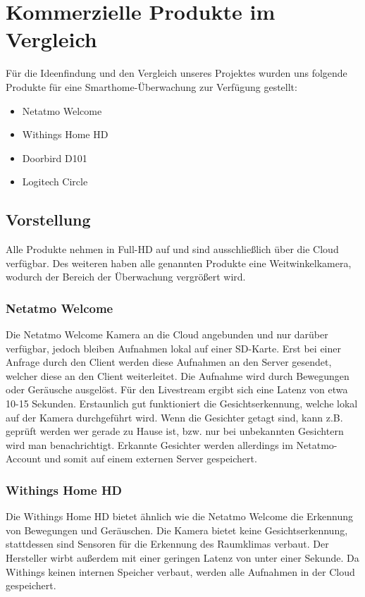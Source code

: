 \chapter{Kommerzielle Produkte im Vergleich}
Für die Ideenfindung und den Vergleich unseres Projektes wurden uns folgende Produkte für eine Smarthome-Überwachung zur Verfügung gestellt:

\begin{itemize}
	\item Netatmo Welcome
	\item Withings Home HD
	\item Doorbird D101
	\item Logitech Circle
\end{itemize}

\section{Vorstellung}

Alle Produkte nehmen in Full-HD  auf und sind ausschließlich über die Cloud verfügbar. Des weiteren haben alle genannten Produkte eine Weitwinkelkamera, wodurch der Bereich der Überwachung vergrößert wird.

\subsection{Netatmo Welcome}
Die Netatmo Welcome Kamera an die Cloud angebunden und nur darüber verfügbar, jedoch bleiben Aufnahmen lokal auf einer SD-Karte. Erst bei einer Anfrage durch den Client werden diese Aufnahmen an den Server gesendet, welcher diese an den Client weiterleitet. Die Aufnahme wird durch Bewegungen oder Geräusche ausgelöst. Für den Livestream ergibt sich eine Latenz von etwa 10-15 Sekunden. Erstaunlich gut funktioniert die Gesichtserkennung, welche lokal auf der Kamera durchgeführt wird. Wenn die Gesichter getagt sind, kann z.B. geprüft werden wer gerade zu Hause ist, bzw. nur bei unbekannten Gesichtern wird man benachrichtigt. Erkannte Gesichter werden allerdings im Netatmo-Account und somit auf einem externen Server gespeichert.

\subsection{Withings Home HD}
Die Withings Home HD bietet ähnlich wie die Netatmo Welcome die Erkennung von Bewegungen und Geräuschen. Die Kamera bietet keine Gesichtserkennung, stattdessen sind Sensoren für die Erkennung des Raumklimas verbaut. Der Hersteller wirbt außerdem mit einer geringen Latenz von unter einer Sekunde. Da Withings keinen internen Speicher verbaut, werden alle Aufnahmen in der Cloud gespeichert.

